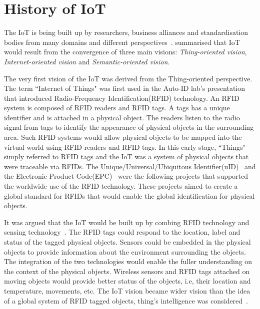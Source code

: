 \section{History of IoT}
\label{sec:history_of_iot}
The IoT is being built up by researchers, business alliances and standardisation bodies from many domains and different perspectives~\citep{Minerva:2015}.
\cite{Atzori:2010} summarised that IoT would result from the convergence of three main visions: \textit{Thing-oriented vision}, \textit{Internet-oriented vision} and \textit{Semantic-oriented vision}.

The very first vision of the IoT was derived from the Thing-oriented perspective.
The term ``Internet of Things" was first used in the Auto-ID lab's presentation that introduced Radio-Frequency Identification(RFID) technology. 
An RFID system is composed of RFID readers and RFID tags.
A tags has a unique identifier and is attached in a physical object.
The readers listen to the radio signal from tags to identify the appearance of physical objects in the surrounding area. 
Such RFID systems would allow physical objects to be mapped into the virtual world using RFID readers and RFID tags.
In this early stage, ``Things" simply referred to RFID tags and the IoT was a system of physical objects that were traceable via RFIDs. 
The Unique/Universal/Ubiquitous Identifier(uID)~\citep{Sakamura:2006} and the Electronic Product Code(EPC)~\citep{Armenio:2007} were the following projects that supported the worldwide use of the RFID technology.
These projects aimed to create a global standard for RFIDs that would enable the global identification for physical objects.

It was argued that the IoT would be built up by combing RFID technology and sensing technology~\citep{ITU:2005}.
The RFID tags could respond to the location, label and status of the tagged physical objects.
Sensors could be embedded in the physical objects to provide information about the environment surrounding the objects. 
The integration of the two technologies would enable the fuller understanding on the context of the physical objects.
Wireless sensors and RFID tags attached on moving objects would provide better status of the objects, i.e, their location and temperature, movements, etc.
The IoT vision became wider vision than the idea of a global system of RFID tagged objects, thing's intelligence was considered~\citep{Sterling:2005}. 

